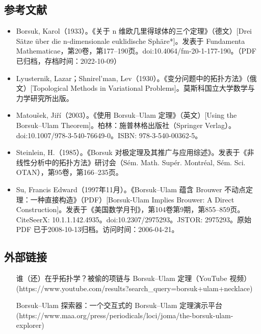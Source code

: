 \subsection{参考文献}
\begin{itemize}
\item Borsuk, Karol（1933）。《关于 n 维欧几里得球体的三个定理》（德文）[Drei Sätze über die n-dimensionale euklidische Sphäre*]。发表于 Fundamenta Mathematicae，第20卷，第177–190页。doi:10.4064/fm-20-1-177-190。（PDF 已归档，存档时间：2022-10-09）
\item Lyusternik, Lazar；Shnirel'man, Lev（1930）。《变分问题中的拓扑方法》（俄文）[Topological Methods in Variational Problems]。莫斯科国立大学数学与力学研究所出版。
\item Matoušek, Jiří（2003）。《使用 Borsuk–Ulam 定理》（英文）[Using the Borsuk–Ulam Theorem]。柏林：施普林格出版社（Springer Verlag）。doi:10.1007/978-3-540-76649-0。ISBN: 978-3-540-00362-5。
\item Steinlein, H.（1985）。《Borsuk 对极定理及其推广与应用综述》。发表于《非线性分析中的拓扑方法》研讨会（Sém. Math. Supér. Montréal, Sém. Sci. OTAN），第95卷，第166–235页。
\item Su, Francis Edward（1997年11月）。《Borsuk–Ulam 蕴含 Brouwer 不动点定理：一种直接构造》（PDF）[Borsuk-Ulam Implies Brouwer: A Direct Construction]。发表于《美国数学月刊》，第104卷第9期，第855–859页。CiteSeerX: 10.1.1.142.4935。doi:10.2307/2975293。JSTOR: 2975293。原始 PDF 已于2008-10-13归档。访问时间：2006-04-21。
\end{itemize}
\subsection{外部链接}
\begin{itemize}
\item [谁（还）在乎拓扑学？被偷的项链与 Borsuk–Ulam 定理（YouTube 视频）](https://www.youtube.com/results?search_query=borsuk+ulam+necklace)
\item [Borsuk–Ulam 探索器：一个交互式的 Borsuk–Ulam 定理演示平台](https://www.maa.org/press/periodicals/loci/joma/the-borsuk-ulam-explorer)
\end{itemize}